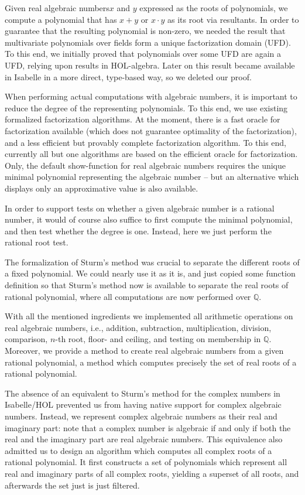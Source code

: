 \documentclass[11pt,a4paper]{article}
\newcommand\rats{\mathbb{Q}}
\newcommand\rais{real algebraic numbers\xspace}
\begin{document}
Given \rais $x$ and $y$ expressed as the roots of polynomials,
we compute a polynomial that has $x+y$ or $x \cdot y$ as its root via resultants.
In order to guarantee that the resulting polynomial is non-zero, we needed the result
that multivariate polynomials over fields form a unique factorization domain (UFD).
To this end, we initially proved that polynomials over some UFD are again a UFD, relying
upon results in HOL-algebra. Later on this result became available in Isabelle in a more
direct, type-based way, so we deleted our proof.

When performing actual computations with algebraic numbers, it is important to reduce
the degree of the representing polynomials. To this end, we use existing
formalized factorization algorithms. At the moment, there is a fast oracle for factorization
available (which does not guarantee optimality of the factorization), and a less efficient
but provably complete factorization algorithm. To this end, currently all but one algorithms are
based on the efficient oracle for factorization. Only, the default show-function for real 
algebraic numbers requires the unique minimal polynomial representing the algebraic number --
but an alternative which displays only an approximative value is also available.

In order to support tests on whether a given algebraic number is a rational number, 
it would of course also suffice to first compute the minimal polynomial, and then test 
whether the degree is one. Instead, here we just perform the rational root test.

The formalization of Sturm's method \cite{Sturm-AFP} was crucial to separate the different
roots of a fixed polynomial. 
We could nearly use it as it is, and just copied some function definition so
that Sturm's method now is available to separate the real roots of rational polynomial, where
all computations are now performed over $\rats$.

With all the mentioned ingredients we implemented all arithmetic operations on real algebraic
numbers, i.e., addition, subtraction, multiplication, division, comparison, $n$-th root, floor-
and ceiling, and testing on membership in $\rats$. Moreover, we provide a method
to create real algebraic numbers from a given rational polynomial, a method which computes
precisely the set of real roots of a rational polynomial.

\medskip

The absence of an equivalent to Sturm's method for the complex numbers in Isabelle/HOL prevented
us from having native support for complex algebraic numbers. Instead, we represent complex
algebraic numbers as their real and imaginary part: note that a complex number is algebraic if
and only if both the real and the imaginary part are real algebraic numbers.
This equivalence also admitted us to design an algorithm which computes all complex roots
of a rational polynomial. It first constructs a set of polynomials which represent all
real and imaginary parts of all complex roots, yielding a superset of all roots,
and afterwards the set just is just filtered.
\end{document}
